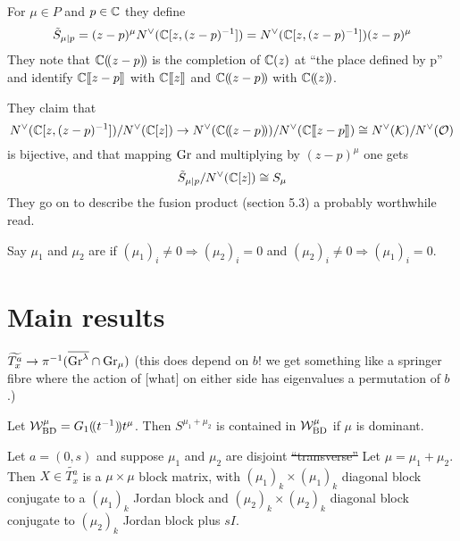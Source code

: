 \documentclass{article}
\begin{document}
For $\mu\in P$ and $p\in\CC$ they define 
\[
    \tilde S_{\mu | p} = (z-p)^\mu N^\vee (\CC[z,(z-p)^{-1}]) = N^\vee (\CC[z,(z-p)^{-1}])(z-p)^\mu
\]
They note that $\CC\xT[z-p]$ is the completion of $\CC(z)$ at ``the place defined by p'' and identify $\CC\xt[z-p]$ with $\CC\xt[z]$ and $\CC\xT[z-p]$ with $\CC\xT[z]$. 

They claim that 
\[
    N^\vee (\CC[z,(z-p)^{-1}])/N^\vee (\CC[z]) \to N^\vee(\CC\xT[z-p])/N^\vee(\CC\xt[z-p]) \cong N^\vee(\cK)/N^\vee(\cO)
\]
is bijective, and that mapping $\Gr$ and multiplying by $(z-p)^\mu$ one gets 
\[
\tilde S_{\mu | p}/N^\vee(\CC[z])\cong S_\mu
\]
They go on to describe the fusion product (section 5.3) a probably worthwhile read. 

\begin{definition}
    Say $\mu_1$ and $\mu_2$ are  if $(\mu_1)_i\ne 0 \Rightarrow (\mu_2)_i = 0$ and $(\mu_2)_i\ne 0 \Rightarrow (\mu_1)_i = 0$. 
\end{definition}


\section{Main results}

\begin{claim}
$\widetilde{T_x^a}\to\pi^{-1}(\overline{\Gr^\lambda}\cap\Gr_\mu)$ (this does depend on $b$! we get something like a springer fibre where the action of [what] on either side has eigenvalues a permutation of $b$.)
\end{claim}

\begin{claim}
Let $\cW^\mu_{\rm BD} = G_1\xT[t^{-1}]t^\mu$. Then $S^{\mu_1 + \mu_2}$ is contained in $\cW^\mu_{\rm BD}$ if $\mu$ is dominant.  
\end{claim}

\begin{claim}
Let $a = (0,s)$ and suppose $\mu_1$ and $\mu_2$ are disjoint \sout{``transverse''} 
Let $\mu = \mu_1 + \mu_2$. Then $X\in\widetilde{T_x^a}$ is a $\mu\times\mu$ block matrix, with $(\mu_1)_k\times(\mu_1)_k$ diagonal block conjugate to a $(\mu_1)_k$ Jordan block and $(\mu_2)_k\times (\mu_2)_k$ diagonal block conjugate to $(\mu_2)_k$ Jordan block plus $sI$.
\end{claim}
\end{document}

